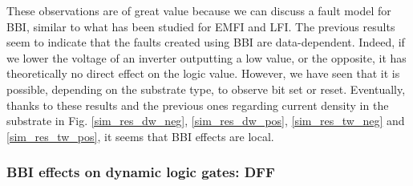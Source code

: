		These observations are of great value because we can discuss a fault model for BBI, similar to what has been studied for EMFI and LFI.
		The previous results seem to indicate that the faults created using BBI are data-dependent.
		Indeed, if we lower the voltage of an inverter outputting a low value, or the opposite, it has theoretically no direct effect on the logic value.
		However, we have seen that it is possible, depending on the substrate type, to observe bit set or reset.
		Eventually, thanks to these results and the previous ones regarding current density in the substrate in Fig. \ref{sim_res_dw_neg}, \ref{sim_res_dw_pos}, \ref{sim_res_tw_neg} and \ref{sim_res_tw_pos}, it seems that BBI effects are local.

	\subsubsection{BBI effects on dynamic logic gates: DFF}

%
%	
%
